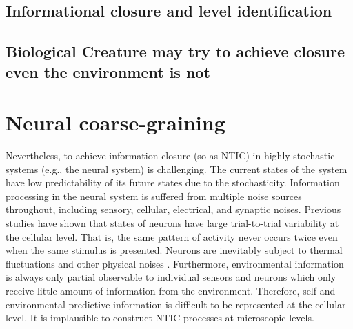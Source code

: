 \documentclass[utf8]{article}
\begin{document}

		\subsection{Informational closure and level identification}


		\subsection{Biological Creature may try to achieve closure even the environment is not}



	\section{Neural coarse-graining}

		Nevertheless, to achieve information closure (so as NTIC) in highly stochastic systems (e.g., the neural system) is challenging. The current states of the system have low predictability of its future states due to the stochasticity. Information processing in the neural system is suffered from multiple noise sources throughout, including sensory, cellular, electrical, and synaptic noises. Previous studies have shown that states of neurons have large trial-to-trial variability at the cellular level. That is, the same pattern of activity never occurs twice even when the same stimulus is presented. Neurons are inevitably subject to thermal fluctuations and other physical noises \citep{faisal2008noise}. Furthermore, environmental information is always only partial observable to individual sensors and neurons which only receive little amount of information from the environment. Therefore, self and environmental predictive information is difficult to be represented at the cellular level. It is implausible to construct NTIC processes at microscopic levels.
\end{document}
